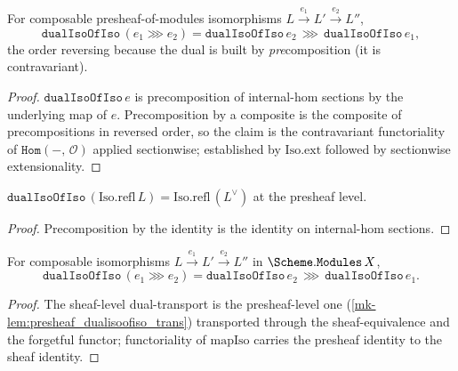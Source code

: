 \begin{lemma}\label{mk-lem:presheaf_dualisoofiso_trans}
  \leanok

  For composable presheaf-of-modules isomorphisms \(L \xrightarrow{e_1} L' \xrightarrow{e_2} L''\),
  \[
    \mathtt{dualIsoOfIso}\,(e_1 \ggg e_2)
      = \mathtt{dualIsoOfIso}\,e_2 \,\ggg\, \mathtt{dualIsoOfIso}\,e_1,
  \]
  the order reversing because the dual is built by \emph{pre}composition (it is contravariant).
\end{lemma}
\begin{proof}
  \leanok
  \(\mathtt{dualIsoOfIso}\,e\) is precomposition of internal-hom sections by the underlying map of
  \(e\). Precomposition by a composite is the composite of precompositions in reversed order, so
  the claim is the contravariant functoriality of \(\mathtt{Hom}(-,\,\mathcal{O})\) applied
  sectionwise; established by \(\mathrm{Iso.ext}\) followed by sectionwise extensionality.
\end{proof}

\begin{lemma}\label{mk-lem:presheaf_dualisoofiso_refl}
  \leanok

  \(\mathtt{dualIsoOfIso}\,(\mathrm{Iso.refl}\,L) = \mathrm{Iso.refl}\,(L^{\vee})\) at the presheaf
  level.
\end{lemma}
\begin{proof}
  \leanok
  Precomposition by the identity is the identity on internal-hom sections.
\end{proof}

\begin{lemma}\label{mk-lem:dualisoofiso_trans}
  \leanok

  For composable isomorphisms \(L \xrightarrow{e_1} L' \xrightarrow{e_2} L''\) in
  \(\Scheme.\mathtt{Modules}\,X\),
  \[
    \mathtt{dualIsoOfIso}\,(e_1 \ggg e_2)
      = \mathtt{dualIsoOfIso}\,e_2 \,\ggg\, \mathtt{dualIsoOfIso}\,e_1.
  \]
\end{lemma}
\begin{proof}
  \leanok
  The sheaf-level dual-transport is the presheaf-level one
  (\ref{mk-lem:presheaf_dualisoofiso_trans}) transported through the sheaf-equivalence and the
  forgetful functor; functoriality of \(\mathrm{mapIso}\) carries the presheaf identity to the
  sheaf identity.
\end{proof}


